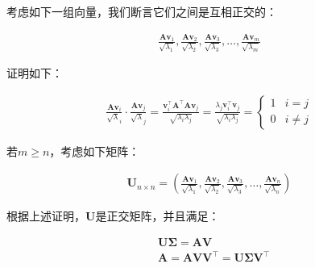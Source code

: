 \documentclass[UTF8]{book}
\begin{document}
考虑如下一组向量，我们断言它们之间是互相正交的：
\begin{large}
    \begin{equation}
        \begin{aligned}
            \frac{\mathbf{A}\mathbf{v}_1}{\sqrt{\lambda_1}},\frac{\mathbf{A}\mathbf{v}_2}{\sqrt{\lambda_2}},\frac{\mathbf{A}\mathbf{v}_3}{\sqrt{\lambda_3}},\dots,\frac{\mathbf{A}\mathbf{v}_m}{\sqrt{\lambda_m}}
            \nonumber
        \end{aligned}
    \end{equation}
\end{large}
证明如下：
\begin{large}
    \begin{equation}
        \begin{aligned}
            \frac{\mathbf{A}\mathbf{v}_i}{\sqrt{\lambda}_i} \cdot \frac{\mathbf{A}\mathbf{v}_j}{\sqrt{\lambda}_j} = \frac{\mathbf{v}_i^\top\mathbf{A}^\top\mathbf{A}\mathbf{v}_j}{\sqrt{\lambda_i\lambda_j}} 
            = \frac{\lambda_j\mathbf{v}_i^\top\mathbf{v}_j}{\sqrt{\lambda_i\lambda_j}} 
            = \begin{cases}
                1 & i=j \\
                0 & i\not = j
                \end{cases}
            \nonumber
        \end{aligned}
    \end{equation}
\end{large}
若$m\ge n$，考虑如下矩阵：
\begin{large}
    \begin{equation}
        \begin{aligned}
            \mathbf{U}_{n\times n}=\left (  \frac{\mathbf{A}\mathbf{v}_1}{\sqrt{\lambda_1}},\frac{\mathbf{A}\mathbf{v}_2}{\sqrt{\lambda_2}},\frac{\mathbf{A}\mathbf{v}_3}{\sqrt{\lambda_3}},\dots,\frac{\mathbf{A}\mathbf{v}_n}{\sqrt{\lambda_n}}\right )
            \nonumber
        \end{aligned}
    \end{equation}
\end{large}
根据上述证明，$\mathbf{U}$是正交矩阵，并且满足：
\begin{large}
    \begin{equation}
        \begin{aligned}
            &\mathbf{U}\mathbf{\Sigma}=\mathbf{A}\mathbf{V} \\
            &\mathbf{A}=\mathbf{A}\mathbf{V}\mathbf{V}^\top=\mathbf{U}\mathbf{\Sigma}\mathbf{V}^\top
            \nonumber
        \end{aligned}
    \end{equation}
\end{large}
\end{document}
